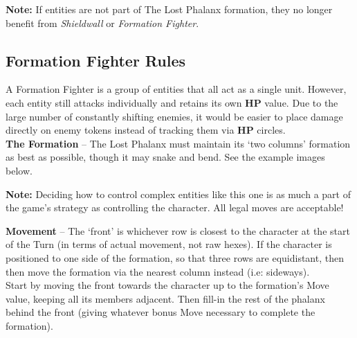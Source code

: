 \begin{tcolorbox}
\textbf{Note:} If entities are not part of The Lost Phalanx formation, they no longer benefit from \emph{Shieldwall} or \emph{Formation Fighter}.
\end{tcolorbox}

\pagebreak

\subsection*{Formation Fighter Rules}
A Formation Fighter is a group of entities that all act as a single unit. However, each entity still attacks individually and retains its own \textbf{HP} value. Due to the large number of constantly shifting enemies, it would be easier to place damage directly on enemy tokens instead of tracking them via \textbf{HP} circles.\\

\textbf{The Formation} -- The Lost Phalanx must maintain its ‘two columns’ formation as best as possible, though it may snake and bend. See the example images below.

\begin{tcolorbox}
\textbf{Note:} Deciding how to control complex entities like this one is as much a part of the game’s strategy as controlling the character. All legal moves are acceptable!
\end{tcolorbox}

\textbf{Movement} -- The ‘front’ is whichever row is closest to the character at the start of the Turn (in terms of actual movement, not raw hexes). If the character is positioned to one side of the formation, so that three rows are equidistant, then then move the formation via the nearest column instead (i.e: sideways).\\
Start by moving the front towards the character up to the formation’s Move value, keeping all its members adjacent. Then fill-in the rest of the phalanx behind the front (giving whatever bonus Move necessary to complete the formation).

